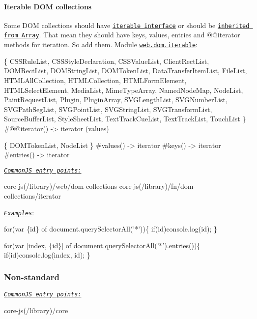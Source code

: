  \paragraph*{Iterable D\+OM collections}

Some D\+OM collections should have \href{https://heycam.github.io/webidl/#idl-iterable}{\tt iterable interface} or should be \href{https://heycam.github.io/webidl/#LegacyArrayClass}{\tt inherited from {\ttfamily Array}}. That mean they should have {\ttfamily keys}, {\ttfamily values}, {\ttfamily entries} and {\ttfamily @@iterator} methods for iteration. So add them. Module \href{https://github.com/zloirock/core-js/blob/v2.6.0/modules/web.dom.iterable.js}{\tt {\ttfamily web.\+dom.\+iterable}}\+: 
\begin{DoxyCode}
\{
  CSSRuleList,
  CSSStyleDeclaration,
  CSSValueList,
  ClientRectList,
  DOMRectList,
  DOMStringList,
  DOMTokenList,
  DataTransferItemList,
  FileList,
  HTMLAllCollection,
  HTMLCollection,
  HTMLFormElement,
  HTMLSelectElement,
  MediaList,
  MimeTypeArray,
  NamedNodeMap,
  NodeList,
  PaintRequestList,
  Plugin,
  PluginArray,
  SVGLengthList,
  SVGNumberList,
  SVGPathSegList,
  SVGPointList,
  SVGStringList,
  SVGTransformList,
  SourceBufferList,
  StyleSheetList,
  TextTrackCueList,
  TextTrackList,
  TouchList
\}
  #@@iterator() -> iterator (values)

\{
  DOMTokenList,
  NodeList
\}
  #values()  -> iterator
  #keys()    -> iterator
  #entries() -> iterator
\end{DoxyCode}
 \href{#commonjs}{\tt {\itshape Common\+JS entry points\+:}} 
\begin{DoxyCode}
core-js(/library)/web/dom-collections
core-js(/library)/fn/dom-collections/iterator
\end{DoxyCode}
 \href{http://goo.gl/lfXVFl}{\tt {\itshape Examples}}\+: 
\begin{DoxyCode}
for(var \{id\} of document.querySelectorAll('*'))\{
  if(id)console.log(id);
\}

for(var [index, \{id\}] of document.querySelectorAll('*').entries())\{
  if(id)console.log(index, id);
\}
\end{DoxyCode}
 \subsubsection*{Non-\/standard}

\href{#commonjs}{\tt {\itshape Common\+JS entry points\+:}} 
\begin{DoxyCode}
core-js(/library)/core
\end{DoxyCode}
